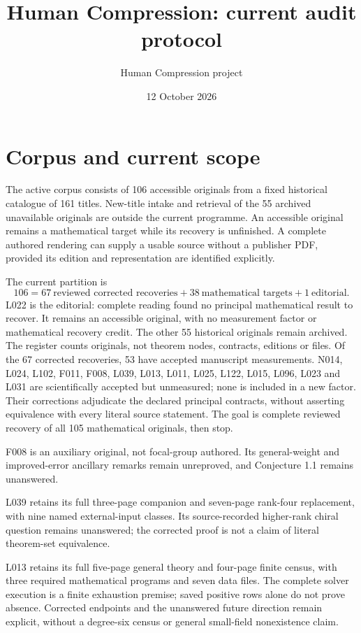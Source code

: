 \documentclass[11pt,a4paper]{article}
\title{Human Compression: current audit protocol}
\author{Human Compression project}
\date{12 October 2026}
\begin{document}
\maketitle

\section{Corpus and current scope}

The active corpus consists of 106 accessible originals from a fixed historical
catalogue of 161 titles. New-title intake and retrieval of the 55 archived
unavailable originals are outside the current programme. An accessible original
remains a mathematical target while its recovery is unfinished. A complete
authored rendering can supply a usable source without a publisher PDF, provided
its edition and representation are identified explicitly.

The current partition is
\[
106=67\ \text{reviewed corrected recoveries}+38\ \text{mathematical targets}
       +1\ \text{editorial}.
\]
L022 is the editorial: complete reading found no principal mathematical result
to recover. It remains an accessible original, with no measurement factor or
mathematical recovery credit. The other 55 historical originals remain archived.
The register counts originals, not theorem nodes, contracts, editions or files.
Of the 67 corrected recoveries, 53 have accepted manuscript measurements.
N014, L024, L102, F011, F008, L039, L013, L011, L025, L122, L015, L096, L023 and L031 are scientifically accepted but unmeasured; none is included
in a new factor. Their corrections adjudicate the declared principal contracts,
without asserting equivalence with every literal source statement. The goal
is complete reviewed recovery of all 105 mathematical originals, then stop.

F008 is an auxiliary original, not focal-group authored. Its general-weight and
improved-error ancillary remarks remain unreproved, and Conjecture 1.1 remains
unanswered.

L039 retains its full three-page companion and seven-page rank-four replacement,
with nine named external-input classes. Its source-recorded higher-rank chiral
question remains unanswered; the corrected proof is not a claim of literal
theorem-set equivalence.

L013 retains its full five-page general theory and four-page finite census,
with three required mathematical programs and seven data files. The complete
solver execution is a finite exhaustion premise; saved positive rows alone do
not prove absence. Corrected endpoints and the unanswered future direction
remain explicit, without a degree-six census or general small-field nonexistence
claim.
\end{document}
